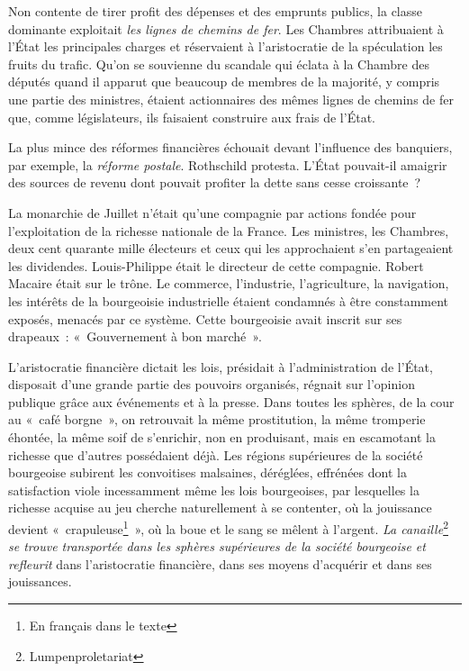 \documentclass[twoside]{book} %
\begin{document}
Non contente de tirer profit des dépenses et des emprunts publics, la classe dominante exploitait \emph{les lignes de chemins de fer}. Les Chambres attribuaient à l’État les principales charges et réservaient à l’aristocratie de la spéculation les fruits du trafic. Qu’on se souvienne du scandale qui éclata à la Chambre des députés quand il apparut que beaucoup de membres de la majorité, y compris une partie des ministres, étaient actionnaires des mêmes lignes de chemins de fer que, comme législateurs, ils faisaient construire aux frais de l’État.\par
La plus mince des réformes financières échouait devant l’influence des banquiers, par exemple, la \emph{réforme postale}. Rothschild protesta. L’État pouvait-il amaigrir des sources de revenu dont pouvait profiter la dette sans cesse croissante ?\par
La monarchie de Juillet n’était qu’une compagnie par actions fondée pour l’exploitation de la richesse nationale de la France. Les ministres, les Chambres, deux cent quarante mille électeurs et ceux qui les approchaient s’en partageaient les dividendes. Louis-Philippe était le directeur de cette compagnie. Robert Macaire était sur le trône. Le commerce, l’industrie, l’agriculture, la navigation, les intérêts de la bourgeoisie industrielle étaient condamnés à être constamment exposés, menacés par ce système. Cette bourgeoisie avait inscrit sur ses drapeaux : « Gouvernement à bon marché ».\par
L’aristocratie financière dictait les lois, présidait à l’administration de l’État, disposait d’une grande partie des pouvoirs organisés, régnait sur l’opinion publique grâce aux événements et à la presse. Dans toutes les sphères, de la cour au « café borgne », on retrouvait la même prostitution, la même tromperie éhontée, la même soif de s’enrichir, non en produisant, mais en escamotant la richesse que d’autres possédaient déjà. Les régions supérieures de la société bourgeoise subirent les convoitises malsaines, déréglées, effrénées dont la satisfaction viole incessamment même les lois bourgeoises, par lesquelles la richesse acquise au jeu cherche naturellement à se contenter, où la jouissance devient « crapuleuse\footnote{En français dans le texte} », où la boue et le sang se mêlent à l’argent. \emph{La canaille}\footnote{Lumpenproletariat}\emph{ se trouve transportée dans les sphères supérieures de la société bourgeoise et refleurit} dans l’aristocratie financière, dans ses moyens d’acquérir et dans ses jouissances.\par
\end{document}
